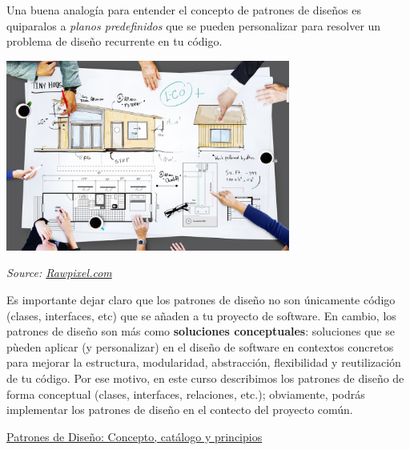 \documentclass[
  letterpaper,
  DIV=11,
  numbers=noendperiod,
  oneside]{scrartcl}
\begin{document}
Una buena analogía para entender el concepto de patrones de diseños es
quiparalos a \emph{planos predefinidos} que se pueden personalizar para
resolver un problema de diseño recurrente en tu código.

\begin{marginfigure}

{\centering \includegraphics[width=0.7\textwidth,height=\textheight]{../images/rawpixel/home-layout-discussion.jpg}

}

\end{marginfigure}

\emph{Source:
\href{https://www.rawpixel.com/image/691263/}{Rawpixel.com}}

Es importante dejar claro que los patrones de diseño no son únicamente
código (clases, interfaces, etc) que se añaden a tu proyecto de
software. En cambio, los patrones de diseño son más como
\textbf{soluciones conceptuales}: soluciones que se pùeden aplicar (y
personalizar) en el diseño de software en contextos concretos para
mejorar la estructura, modularidad, abstracción, flexibilidad y
reutilización de tu código. Por ese motivo, en este curso describimos
los patrones de diseño de forma conceptual (clases, interfaces,
relaciones, etc.); obviamente, podrás implementar los patrones de diseño
en el contecto del proyecto común.

\begin{tcolorbox}[enhanced jigsaw, breakable, bottomtitle=1mm, toptitle=1mm, toprule=.15mm, opacitybacktitle=0.6, left=2mm, rightrule=.15mm, arc=.35mm, colbacktitle=quarto-callout-tip-color!10!white, opacityback=0, colback=white, titlerule=0mm, coltitle=black, title={\textbf{Slide Deck}}, colframe=quarto-callout-tip-color-frame, leftrule=.75mm, bottomrule=.15mm]

\href{02-patrones-slides.qmd}{Patrones de Diseño: Concepto, catálogo y
principios}

\end{tcolorbox}
\end{document}
